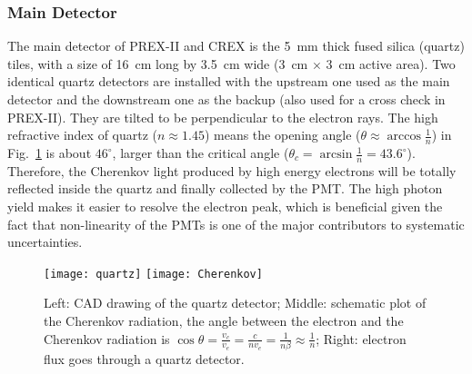 \subsubsection{Main Detector}
The main detector of PREX-II and CREX is the 5~mm thick fused silica (quartz) tiles,
with a size of 16~cm long by 3.5~cm wide (3~cm $\times$ 3~cm active area). 
Two identical quartz detectors are installed with the upstream one used as the 
main detector and the downstream one as the backup (also used for a cross check 
in PREX-II). They are tilted to be perpendicular to the electron rays.
The high refractive index of quartz ($n\approx 1.45$) means the opening angle ($\theta \approx \arccos\frac{1}{n}$)
in Fig.~\ref{fig:quartz} is about $46^\circ$, larger than the critical angle 
($\theta_c = \arcsin\frac{1}{n} = 43.6^\circ$).
Therefore, the Cherenkov light produced by high energy electrons will be totally
reflected inside the quartz and finally collected by the PMT. The high photon
yield makes it easier to resolve the electron peak, which is beneficial given
the fact that non-linearity of the PMTs is one of the major contributors to 
systematic uncertainties.
\begin{figure}[!h]
    \centering
    \texttt{[image: quartz]}
    \texttt{[image: Cherenkov]}
    \caption{Left: CAD drawing of the quartz detector; 
    Middle: schematic plot of the Cherenkov radiation, the angle between 
    the electron and the Cherenkov radiation is 
    $\cos\theta = \frac{v_c}{v_e} = \frac{c}{nv_e} = \frac{1}{n\beta} \approx \frac{1}{n}$;
    Right: electron flux goes through a quartz detector.
    }
    \label{fig:quartz}
\end{figure}

